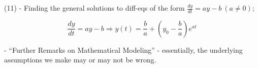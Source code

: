 \documentclass[../../diff_eqs.tex]{subfiles}
\begin{document}



%


(11) - Finding the general solutions to diff-eqs of the form $\frac{dy}{dt} = ay - b \ (a \not = 0)$;

$$\frac{dy}{dt} = ay - b \Longrightarrow y(t) = \frac{b}{a} + \left(y_0 - \frac{b}{a}\right)e^{at}$$

 - ``Further Remarks on Mathematical Modeling'' - essentially, the underlying assumptions we make may or may not be wrong. \textrangle
\end{document}
